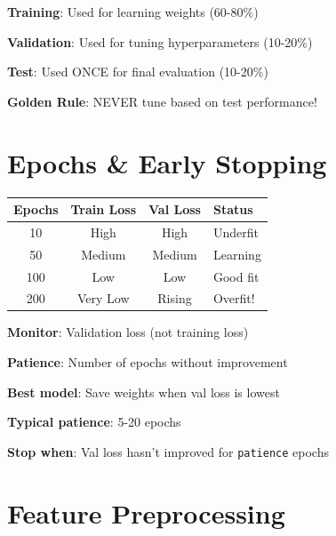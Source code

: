 \documentclass[11pt,a4paper]{article}
\begin{document}
\begin{notebox}

\textbf{Training}: Used for learning weights (60-80\%)

\textbf{Validation}: Used for tuning hyperparameters (10-20\%)

\textbf{Test}: Used ONCE for final evaluation (10-20\%)

\textbf{Golden Rule}: NEVER tune based on test performance!
\end{notebox}

\section{Epochs \& Early Stopping}

\begin{definitionbox}

\begin{tabular}{@{}c|cc|l@{}}
\textbf{Epochs} & \textbf{Train Loss} & \textbf{Val Loss} & \textbf{Status} \\
\hline
10 & High & High & Underfit \\
50 & Medium & Medium & Learning \\
100 & Low & Low & Good fit \\
200 & Very Low & Rising & Overfit! \\
\end{tabular}
\end{definitionbox}

\begin{warningbox}

\textbf{Monitor}: Validation loss (not training loss)

\textbf{Patience}: Number of epochs without improvement

\textbf{Best model}: Save weights when val loss is lowest

\textbf{Typical patience}: 5-20 epochs

\textbf{Stop when}: Val loss hasn't improved for \texttt{patience} epochs
\end{warningbox}

\section{Feature Preprocessing}
\end{document}
